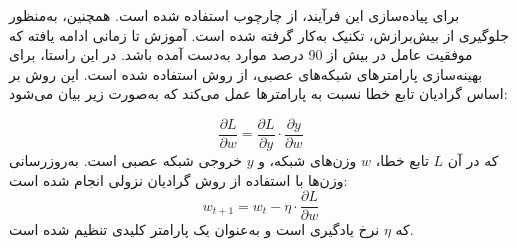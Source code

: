 برای پیاده‌سازی این فرآیند، از چارچوب  استفاده شده است. همچنین، به‌منظور جلوگیری از بیش‌برازش، تکنیک  به‌کار گرفته شده است. آموزش تا زمانی ادامه یافته که موفقیت عامل در بیش از 90 درصد موارد به‌دست آمده باشد. در این راستا، برای بهینه‌سازی پارامترهای شبکه‌های عصبی، از روش  استفاده شده است. این روش بر اساس گرادیان تابع خطا نسبت به پارامترها عمل می‌کند که به‌صورت زیر بیان می‌شود:
































\begin{equation}
	\frac{\partial L}{\partial w} = \frac{\partial L}{\partial y} \cdot \frac{\partial y}{\partial w}
\end{equation}
که در آن \( L \) تابع خطا، \( w \) وزن‌های شبکه، و \( y \) خروجی شبکه عصبی است. 
به‌روزرسانی وزن‌ها با استفاده از روش گرادیان نزولی انجام شده است:
\begin{equation}
	w_{t+1} = w_t - \eta \cdot \frac{\partial L}{\partial w}
\end{equation}
که \( \eta \) نرخ یادگیری است و به‌عنوان یک پارامتر کلیدی تنظیم شده است.




